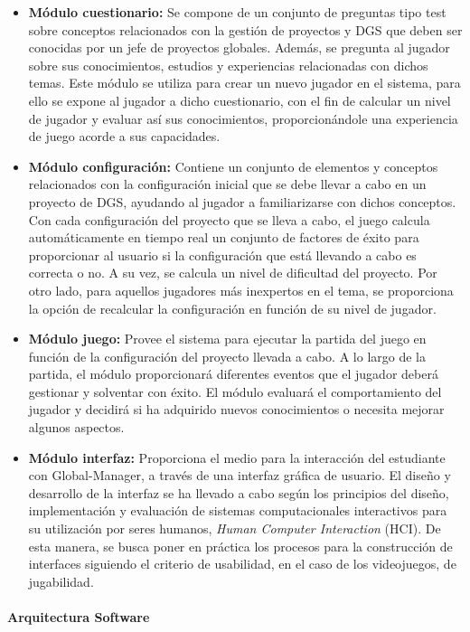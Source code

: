 \begin{itemize}
	\item \textbf{Módulo cuestionario:} Se compone de un conjunto de preguntas tipo test sobre conceptos relacionados con la gestión de proyectos y DGS que deben ser conocidas por un jefe de proyectos globales. Además, se pregunta al jugador sobre sus conocimientos, estudios y experiencias relacionadas con dichos temas. Este módulo se utiliza para crear un nuevo jugador en el sistema, para ello se expone al jugador a dicho cuestionario, con el fin de calcular un nivel de jugador y evaluar así sus conocimientos, proporcionándole una experiencia de juego acorde a sus capacidades.
	\item \textbf{Módulo configuración:} Contiene un conjunto de elementos y conceptos relacionados con la configuración inicial que se debe llevar a cabo en un proyecto de DGS, ayudando al jugador a familiarizarse con dichos conceptos. Con cada configuración del proyecto que se lleva a cabo, el juego calcula automáticamente en tiempo real un conjunto de factores de éxito para proporcionar al usuario si la configuración que está llevando a cabo es correcta o no. A su vez, se calcula un nivel de dificultad del proyecto. Por otro lado, para aquellos jugadores más inexpertos en el tema, se proporciona la opción de recalcular la configuración en función de su nivel de jugador.
	\item \textbf{Módulo juego:} Provee el sistema para ejecutar la partida del juego en función de la configuración del proyecto llevada a cabo. A lo largo de la partida, el módulo proporcionará diferentes eventos que el jugador deberá gestionar y solventar con éxito. El módulo evaluará el comportamiento del jugador y decidirá si ha adquirido nuevos conocimientos o necesita mejorar algunos aspectos.
	\item \textbf{Módulo interfaz:} Proporciona el medio para la interacción del estudiante con Global-Manager, a través de una interfaz gráfica de usuario. El diseño y desarrollo de la interfaz se ha llevado a cabo según los principios del diseño, implementación y evaluación de sistemas computacionales interactivos para su utilización por seres humanos, \emph{Human Computer Interaction} (HCI). De esta manera, se busca poner en práctica los procesos para la construcción de interfaces siguiendo el criterio de usabilidad, en el caso de los videojuegos, de jugabilidad.
\end{itemize}

\paragraph*{Arquitectura Software}

